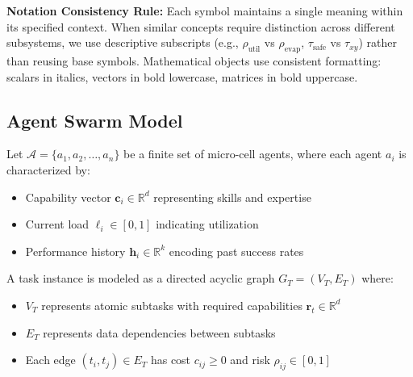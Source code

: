 \documentclass{article}
\begin{document}

\textbf{Notation Consistency Rule:} Each symbol maintains a single meaning within its specified context. 
When similar concepts require distinction across different subsystems, we use descriptive subscripts (e.g., 
$\rho_{\text{util}}$ vs $\rho_{\text{evap}}$, $\tau_{\text{safe}}$ vs $\tau_{xy}$) rather than reusing base symbols. 
Mathematical objects use consistent formatting: scalars in italics, vectors in bold lowercase, matrices in bold uppercase.

\subsection{Agent Swarm Model}

\begin{definition}
Let $\mathcal{A} = \{a_1, a_2, \ldots, a_n\}$ be a finite set of micro-cell agents, where each agent $a_i$ is characterized by:
\begin{itemize}
\item Capability vector $\mathbf{c}_i \in \mathbb{R}^d$ representing skills and expertise
\item Current load $\ell_i \in [0, 1]$ indicating utilization
\item Performance history $\mathbf{h}_i \in \mathbb{R}^k$ encoding past success rates
\end{itemize}
\end{definition}

\begin{definition}
A task instance is modeled as a directed acyclic graph $G_T = (V_T, E_T)$ where:
\begin{itemize}
\item $V_T$ represents atomic subtasks with required capabilities $\mathbf{r}_t \in \mathbb{R}^d$
\item $E_T$ represents data dependencies between subtasks
\item Each edge $(t_i, t_j) \in E_T$ has cost $c_{ij} \geq 0$ and risk $\rho_{ij} \in [0, 1]$
\end{itemize}
\end{definition}
\end{document}
